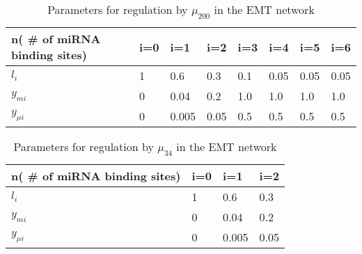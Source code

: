 \documentclass{article}
\begin{document}
\begin{table}[ht]
\begin{tabular}{l|lllllll}
n( \# of miRNA binding sites) & i=0 & i=1 & i=2 &i=3 & i=4 & i=5 & i=6\\
\hline
$l_i$ & 1 & 0.6 & 0.3 & 0.1 & 0.05 & 0.05 & 0.05\\
$y_{mi}$ & 0 & 0.04 & 0.2 & 1.0 & 1.0 & 1.0 & 1.0\\
$y_{\mu i} $& 0 & 0.005 & 0.05 & 0.5 & 0.5 & 0.5 & 0.5\\
\end{tabular}
\label{table:u200Params}
\caption{Parameters for regulation by $\mu_{200}$ in the EMT network}
\end{table}

\begin{table}[ht]
\begin{tabular}{l|lll}
n( \# of miRNA binding sites) & i=0 & i=1 & i=2 \\
\hline
$l_i$ & 1 & 0.6 & 0.3 \\
$y_{mi}$ & 0 & 0.04 & 0.2\\
$y_{\mu i} $& 0 & 0.005 & 0.05\\
\end{tabular}
\label{table:u34params}
\caption{Parameters for regulation by $\mu_{34}$ in the EMT network}
\end{table}
\end{document}
